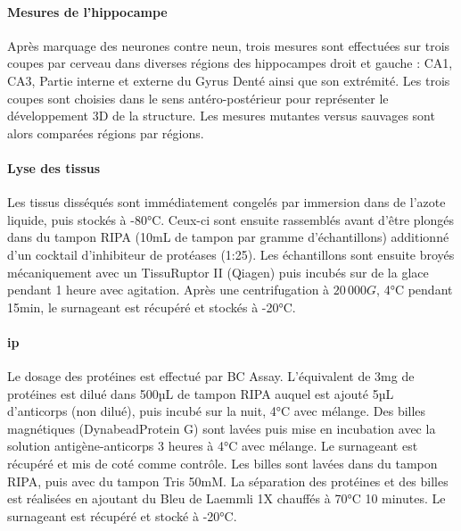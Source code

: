 \paragraph{Mesures de l'hippocampe}
\label{par:hippNeuN}
	Après marquage des neurones contre \acrshort{neun}, trois mesures sont effectuées sur trois coupes par cerveau dans diverses régions des hippocampes droit et gauche : CA1, CA3, Partie interne et externe du Gyrus Denté ainsi que son extrémité. Les trois coupes sont choisies dans le sens antéro-postérieur pour représenter le développement 3D de la structure. Les mesures mutantes versus sauvages sont alors comparées régions par régions.
	
\paragraph{Lyse des tissus}
\label{par:lyse}
	Les tissus disséqués sont immédiatement congelés par immersion dans de l'azote liquide, puis stockés à -80°C. Ceux-ci sont ensuite rassemblés avant d'être plongés dans du tampon RIPA (10mL de tampon par gramme d'échantillons) additionné d'un cocktail d'inhibiteur de protéases (1:25). Les échantillons sont ensuite broyés mécaniquement avec un TissuRuptor II (Qiagen\textregistered) puis incubés sur de la glace pendant 1 heure avec agitation. Après une centrifugation à $20\,000G$, 4°C pendant 15min, le surnageant est récupéré et stockés à -20°C. 
	
\paragraph{\Acrlong{ip}}
\label{par:ip}
	Le dosage des protéines est effectué par BC Assay. L'équivalent de 3mg de protéines est dilué dans 500µL de tampon RIPA auquel est ajouté 5µL d'anticorps (non dilué), puis incubé sur la nuit, 4°C avec mélange. Des billes magnétiques (Dynabead\textregistered Protein G) sont lavées puis mise en incubation avec la solution antigène-anticorps 3 heures à 4°C avec mélange. Le surnageant est récupéré et mis de coté comme contrôle. Les billes sont lavées dans du tampon RIPA, puis avec du tampon Tris 50mM. La séparation des protéines et des billes est réalisées en ajoutant du Bleu de Laemmli 1X chauffés à 70°C 10 minutes. Le surnageant est récupéré et stocké à -20°C. 
	
